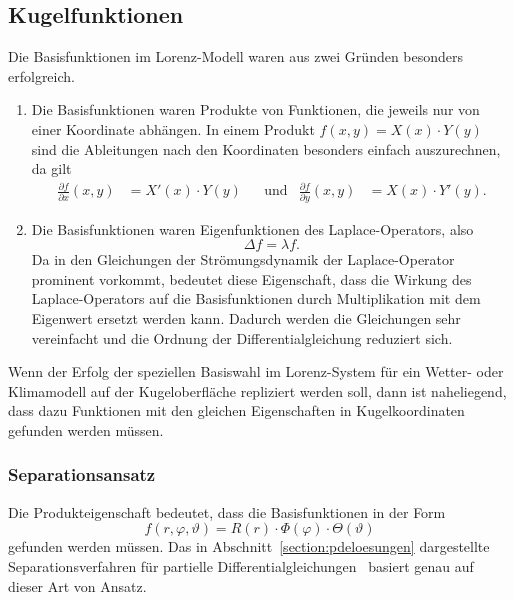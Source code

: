 %
%
%
\subsection{Kugelfunktionen}
Die Basisfunktionen im Lorenz-Modell waren aus zwei Gründen besonders
erfolgreich.
\begin{enumerate}
\item
Die Basisfunktionen waren Produkte von Funktionen, die jeweils nur von
einer Koordinate abhängen.
In einem Produkt 
$f(x,y)=X(x)\cdot Y(y)$ 
sind die Ableitungen nach den Koordinaten besonders einfach auszurechnen,
da gilt
\[
\begin{aligned}
\frac{\partial f}{\partial x}(x,y) &= X'(x)\cdot Y(y)
&&\text{und}&
\frac{\partial f}{\partial y}(x,y) &= X(x)\cdot Y'(y).
\end{aligned}
\]
\item
Die Basisfunktionen waren Eigenfunktionen des Laplace-Operators, also
\[
\Delta f = \lambda f.
\]
Da in den Gleichungen der Strömungsdynamik der Laplace-Operator
prominent vorkommt, bedeutet diese Eigenschaft, dass die Wirkung des
Laplace-Operators auf die Basisfunktionen durch Multiplikation mit
dem Eigenwert ersetzt werden kann.
Dadurch werden die Gleichungen sehr vereinfacht und die Ordnung
der Differentialgleichung reduziert sich.
\end{enumerate}
Wenn der Erfolg der speziellen Basiswahl im Lorenz-System für ein
Wetter- oder Klimamodell auf der Kugeloberfläche repliziert werden
soll, dann ist naheliegend, dass dazu Funktionen mit den gleichen
Eigenschaften in Kugelkoordinaten gefunden werden müssen.

\subsubsection{Separationsansatz}
Die Produkteigenschaft bedeutet, dass die Basisfunktionen in der Form
\[
f(r,\varphi,\vartheta)
=
R(r)\cdot \Phi(\varphi)\cdot \Theta(\vartheta)
\]
gefunden werden müssen.
Das in Abschnitt~\ref{section:pdeloesungen} dargestellte
Separationsverfahren für partielle
Differentialgleichungen~\cite[Chapter 4]{skript:pde}
basiert genau auf dieser Art von Ansatz.

